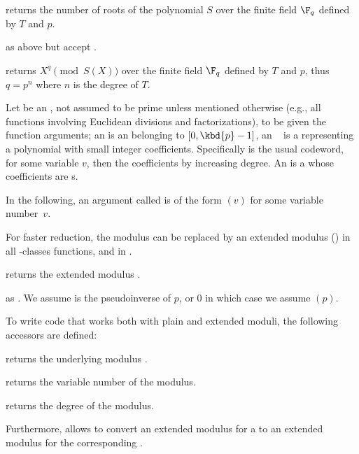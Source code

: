  returns the number of roots of
the polynomial $S$ over the finite field $\F_q$ defined by $T$ and $p$.

 as above but accept .

 returns
$X^{q}\pmod{S(X)}$ over the finite field $\F_q$ defined by $T$ and $p$, thus
$q=p^n$ where $n$ is the degree of $T$.

 Let  be an , not assumed to be
prime unless mentioned otherwise (e.g., all functions involving Euclidean
divisions and factorizations), to be given the function arguments; an
 is an  belonging to $[0,\kbd{p}-1]$, an ~
is a  representing a polynomial with small integer
coefficients. Specifically  is the usual codeword,  for some variable $v$, then the coefficients by increasing
degree. An  is a  whose coefficients are s.

\noindent In the following, an argument called  is of the form
$(v)$ for some variable number~$v$.


For faster reduction, the modulus  can be replaced by an extended
modulus () in all -classes functions, and in
.

 returns the extended modulus .

 as .
We assume  is the pseudoinverse of $p$, or $0$ in which case we
assume $(p)$.

To write code that works both with plain and extended moduli, the following
accessors are defined:

 returns the underlying modulus .

 returns the variable number of the modulus.

 returns the degree of the modulus.

Furthermore,  allows to convert an extended modulus for
a  to an extended modulus for the corresponding .


